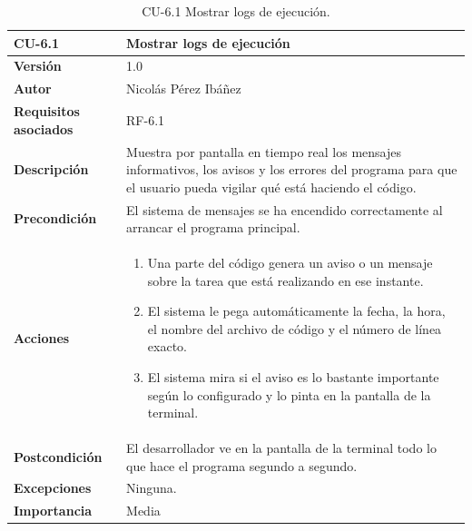 \begin{table}[p]
	\centering
	\begin{tabularx}{\linewidth}{ p{} p{} }
		\toprule
		\textbf{CU-6.1}  & \textbf{Mostrar logs de ejecución}\\
		\toprule
		\textbf{Versión}              & 1.0    \\
		\textbf{Autor}                & Nicolás Pérez Ibáñez \\
		\textbf{Requisitos asociados} & RF-6.1 \\
		\textbf{Descripción}          & Muestra por pantalla en tiempo real los mensajes informativos, los avisos y los errores del programa para que el usuario pueda vigilar qué está haciendo el código. \\
		\textbf{Precondición}         & El sistema de mensajes se ha encendido correctamente al arrancar el programa principal. \\
		\textbf{Acciones}             &
		\begin{enumerate}
			\def\labelenumi{\arabic{enumi}.}
			\tightlist
			\item Una parte del código genera un aviso o un mensaje sobre la tarea que está realizando en ese instante.
			\item El sistema le pega automáticamente la fecha, la hora, el nombre del archivo de código y el número de línea exacto.
			\item El sistema mira si el aviso es lo bastante importante según lo configurado y lo pinta en la pantalla de la terminal.
		\end{enumerate}\\
		\textbf{Postcondición}        & El desarrollador ve en la pantalla de la terminal todo lo que hace el programa segundo a segundo. \\
		\textbf{Excepciones}          & Ninguna. \\
		\textbf{Importancia}          & Media \\
		\bottomrule
	\end{tabularx}
	\caption{CU-6.1 Mostrar logs de ejecución.}
\end{table}

